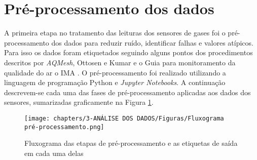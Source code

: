 \section{Pré-processamento dos dados}

A primeira etapa no tratamento das leituras dos sensores de gases foi o pré-processamento dos dados para reduzir ruído, identificar falhas e valores atípicos. Para isso os dados foram etiquetados seguindo alguns pontos dos procedimentos descritos por \textit{AQMesh}, Ottosen e Kumar \cite{Ottosen2019OutlierMeasurements} e o Guia para monitoramento da qualidade do ar o IMA \cite{INSTITUTODEENERGIAEMEIOAMBIENTE2019QualidadeAr}. O pré-processamento foi realizado utilizando a linguagem de programação Python e \textit{Jupyter Notebooks}. A continuação descrevem-se cada uma das fases de pré-processamento aplicadas aos dados dos sensores, sumarizadas graficamente na Figura \ref{fig:preprocessing-flow}.

\begin{figure}[h!]
    \centering
    \caption{Fluxograma das etapas de pré-processamento e as etiquetas de saída em cada uma delas}
    \texttt{[image: chapters/3-ANÁLISE DOS DADOS/Figuras/Fluxograma pré-processamento.png]}
    \label{fig:preprocessing-flow}
\end{figure}

